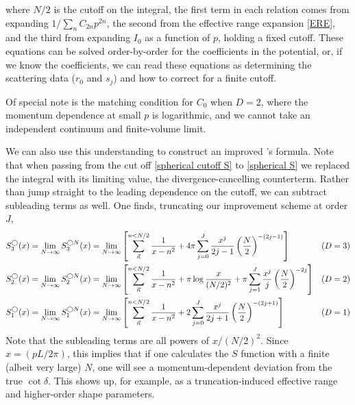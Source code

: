 where $N/2$ is the cutoff on the integral, the first term in each relation comes from expanding $1/\sum_n C_{2n} p^{2n}$, the second from the effective range expansion \eqref{ERE}, and the third from expanding $I_0$ as a function of $p$, holding a fixed cutoff.  These equations can be solved order-by-order for the coefficients in the potential, or, if we know the coefficients, we can read these equations as determining the scattering data ($r_0$ and $s_j$) and how to correct for a finite cutoff.

Of special note is the matching condition for $C_0$ when $D=2$, where the momentum dependence at small $p$ is logarithmic, and we cannot take an independent continuum and finite-volume limit.

We can also use this understanding to construct an improved \Luscher's formula.
Note that when passing from the cut off \eqref{spherical cutoff S} to \eqref{spherical S} we replaced the integral with its limiting value, the divergence-cancelling counterterm.
Rather than jump straight to the leading dependence on the cutoff, we can subtract subleading terms as well.
One finds, truncating our improvement scheme at order $J$,
\begin{align}
    S_3^\bigcirc(x)  = \lim_{N\rightarrow\infty} S^{\bigcirc N}_3(x)
    &=
    \lim_{N\rightarrow\infty}\left[\sum_{\vec{n}}^{n<N/2} \frac{1}{x-n^2}
        + 4\pi \sum_{j=0}^{J} \frac{x^j}{2j-1} \left(\frac{N}{2}\right)^{-(2j-1)}
    \right]
    &
    (D&=3)
    \nonumber\\
    S_2^\bigcirc(x)  = \lim_{N\rightarrow\infty} S^{\bigcirc N}_2(x)
    &=
    \lim_{N\rightarrow\infty}\left[\sum_{\vec{n}}^{n<N/2} \frac{1}{x-n^2}
        + \pi \log \frac{x}{(N/2)^2}
        + \pi \sum_{j=1}^{J} \frac{x^j}{j} \left(\frac{N}{2}\right)^{-2j}
    \right]
    &
    (D&=2)
    \\\nonumber
    S_1^\bigcirc(x)  = \lim_{N\rightarrow\infty} S^{\bigcirc N}_1(x)
    &=
    \lim_{N\rightarrow\infty}\left[\sum_{\vec{n}}^{n<N/2} \frac{1}{x-n^2}
        + 2 \sum_{j=0}^{J} \frac{x^j}{2j+1}\left(\frac{N}{2}\right)^{-(2j+1)}
        \right]
    &
    (D&=1)
\end{align}
Note that the subleading terms are all powers of $x/(N/2)^2$.
Since $x=(pL/2\pi)$, this implies that if one calculates the $S$ function with a finite (albeit very large) $N$, one will see a momentum-dependent deviation from the true $\cot\delta$.
This shows up, for example, as a truncation-induced effective range and higher-order shape parameters.

\begin{center}
\end{center}

